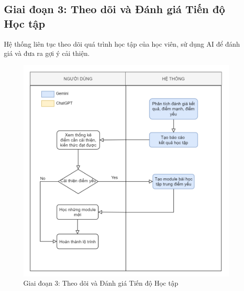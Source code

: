 \subsection{Giai đoạn 3: Theo dõi và Đánh giá Tiến độ Học tập}
Hệ thống liên tục theo dõi quá trình học tập của học viên, sử dụng AI để đánh giá và đưa ra gợi ý cải thiện.
\begin{figure}[H]
    \centering
    \includegraphics[width=\linewidth]{Images/flowchart_3.png}
    \caption{Giai đoạn 3: Theo dõi và Đánh giá Tiến độ Học tập}
\end{figure}
